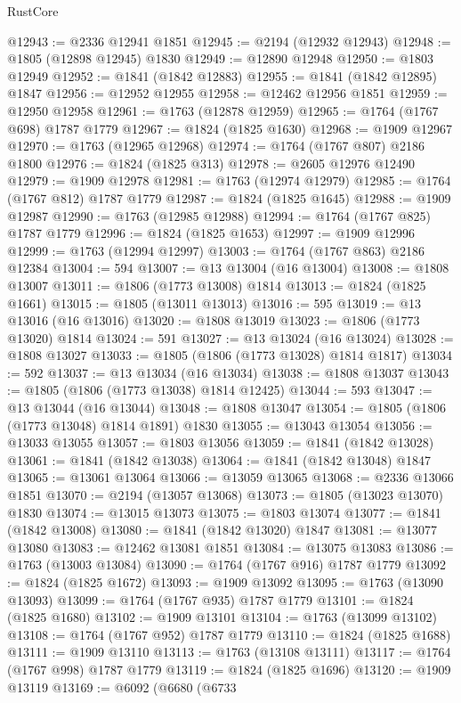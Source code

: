 \begin{lexlean}{RustCore}
\begin{coremodule}
@12943 := @2336 @12941 @1851
@12945 := @2194 (@12932 @12943)
@12948 := @1805 (@12898 @12945) @1830
@12949 := @12890 @12948
@12950 := @1803 @12949
@12952 := @1841 (@1842 @12883)
@12955 := @1841 (@1842 @12895) @1847
@12956 := @12952 @12955
@12958 := @12462 @12956 @1851
@12959 := @12950 @12958
@12961 := @1763 (@12878 @12959)
@12965 := @1764 (@1767 @698) @1787 @1779
@12967 := @1824 (@1825 @1630)
@12968 := @1909 @12967
@12970 := @1763 (@12965 @12968)
@12974 := @1764 (@1767 @807) @2186 @1800
@12976 := @1824 (@1825 @313)
@12978 := @2605 @12976 @12490
@12979 := @1909 @12978
@12981 := @1763 (@12974 @12979)
@12985 := @1764 (@1767 @812) @1787 @1779
@12987 := @1824 (@1825 @1645)
@12988 := @1909 @12987
@12990 := @1763 (@12985 @12988)
@12994 := @1764 (@1767 @825) @1787 @1779
@12996 := @1824 (@1825 @1653)
@12997 := @1909 @12996
@12999 := @1763 (@12994 @12997)
@13003 := @1764 (@1767 @863) @2186 @12384
@13004 := 594
@13007 := @13 @13004 (@16 @13004)
@13008 := @1808 @13007
@13011 := @1806 (@1773 @13008) @1814
@13013 := @1824 (@1825 @1661)
@13015 := @1805 (@13011 @13013)
@13016 := 595
@13019 := @13 @13016 (@16 @13016)
@13020 := @1808 @13019
@13023 := @1806 (@1773 @13020) @1814
@13024 := 591
@13027 := @13 @13024 (@16 @13024)
@13028 := @1808 @13027
@13033 := @1805 (@1806 (@1773 @13028) @1814 @1817)
@13034 := 592
@13037 := @13 @13034 (@16 @13034)
@13038 := @1808 @13037
@13043 := @1805 (@1806 (@1773 @13038) @1814 @12425)
@13044 := 593
@13047 := @13 @13044 (@16 @13044)
@13048 := @1808 @13047
@13054 := @1805 (@1806 (@1773 @13048) @1814 @1891) @1830
@13055 := @13043 @13054
@13056 := @13033 @13055
@13057 := @1803 @13056
@13059 := @1841 (@1842 @13028)
@13061 := @1841 (@1842 @13038)
@13064 := @1841 (@1842 @13048) @1847
@13065 := @13061 @13064
@13066 := @13059 @13065
@13068 := @2336 @13066 @1851
@13070 := @2194 (@13057 @13068)
@13073 := @1805 (@13023 @13070) @1830
@13074 := @13015 @13073
@13075 := @1803 @13074
@13077 := @1841 (@1842 @13008)
@13080 := @1841 (@1842 @13020) @1847
@13081 := @13077 @13080
@13083 := @12462 @13081 @1851
@13084 := @13075 @13083
@13086 := @1763 (@13003 @13084)
@13090 := @1764 (@1767 @916) @1787 @1779
@13092 := @1824 (@1825 @1672)
@13093 := @1909 @13092
@13095 := @1763 (@13090 @13093)
@13099 := @1764 (@1767 @935) @1787 @1779
@13101 := @1824 (@1825 @1680)
@13102 := @1909 @13101
@13104 := @1763 (@13099 @13102)
@13108 := @1764 (@1767 @952) @1787 @1779
@13110 := @1824 (@1825 @1688)
@13111 := @1909 @13110
@13113 := @1763 (@13108 @13111)
@13117 := @1764 (@1767 @998) @1787 @1779
@13119 := @1824 (@1825 @1696)
@13120 := @1909 @13119
@13169 := @6092
    (@6680
      (@6733

\end{coremodule}
\end{lexlean}

